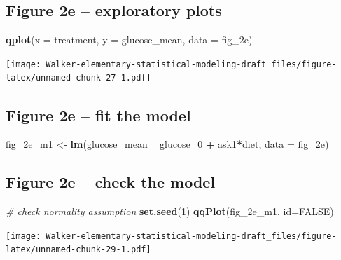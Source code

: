 \documentclass[]{book}
\newenvironment{Shaded}{\begin{snugshade}}{\end{snugshade}}
\newcommand{\CommentTok}[1]{\textcolor[rgb]{0.56,0.35,0.01}{\textit{#1}}}
\newcommand{\DataTypeTok}[1]{\textcolor[rgb]{0.13,0.29,0.53}{#1}}
\newcommand{\DecValTok}[1]{\textcolor[rgb]{0.00,0.00,0.81}{#1}}
\newcommand{\KeywordTok}[1]{\textcolor[rgb]{0.13,0.29,0.53}{\textbf{#1}}}
\newcommand{\NormalTok}[1]{#1}
\newcommand{\OperatorTok}[1]{\textcolor[rgb]{0.81,0.36,0.00}{\textbf{#1}}}
\newcommand{\OtherTok}[1]{\textcolor[rgb]{0.56,0.35,0.01}{#1}}
\newcommand{\StringTok}[1]{\textcolor[rgb]{0.31,0.60,0.02}{#1}}
\begin{document}
\hypertarget{figure-2e-exploratory-plots}{%
\subsection{Figure 2e -- exploratory plots}\label{figure-2e-exploratory-plots}}

\begin{Shaded}
\begin{Highlighting}[]
\KeywordTok{qplot}\NormalTok{(}\DataTypeTok{x =}\NormalTok{ treatment, }\DataTypeTok{y =}\NormalTok{ glucose_mean, }\DataTypeTok{data =}\NormalTok{ fig_2e)}
\end{Highlighting}
\end{Shaded}

\texttt{[image: Walker-elementary-statistical-modeling-draft\_files/figure-latex/unnamed-chunk-27-1.pdf]}

\hypertarget{figure-2e-fit-the-model}{%
\subsection{Figure 2e -- fit the model}\label{figure-2e-fit-the-model}}

\begin{Shaded}
\begin{Highlighting}[]
\NormalTok{fig_2e_m1 <-}\StringTok{ }\KeywordTok{lm}\NormalTok{(glucose_mean }\OperatorTok{~}\StringTok{ }\NormalTok{glucose_}\DecValTok{0} \OperatorTok{+}\StringTok{ }\NormalTok{ask1}\OperatorTok{*}\NormalTok{diet, }\DataTypeTok{data =}\NormalTok{ fig_2e)}
\end{Highlighting}
\end{Shaded}

\hypertarget{figure-2e-check-the-model}{%
\subsection{Figure 2e -- check the model}\label{figure-2e-check-the-model}}

\begin{Shaded}
\begin{Highlighting}[]
\CommentTok{# check normality assumption}
\KeywordTok{set.seed}\NormalTok{(}\DecValTok{1}\NormalTok{)}
\KeywordTok{qqPlot}\NormalTok{(fig_2e_m1, }\DataTypeTok{id=}\OtherTok{FALSE}\NormalTok{)}
\end{Highlighting}
\end{Shaded}

\texttt{[image: Walker-elementary-statistical-modeling-draft\_files/figure-latex/unnamed-chunk-29-1.pdf]}
\end{document}

